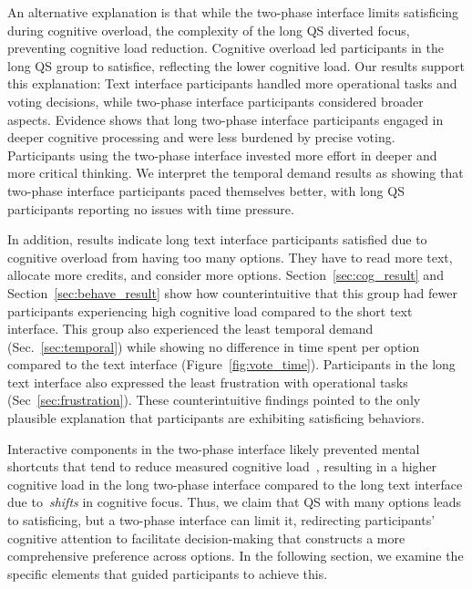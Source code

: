 An alternative explanation is that while the two-phase interface limits satisficing during cognitive overload, the complexity of the long QS diverted focus, preventing cognitive load reduction. Cognitive overload led participants in the long QS group to satisfice, reflecting the lower cognitive load. Our results support this explanation: Text interface participants handled more operational tasks and voting decisions, while two-phase interface participants considered broader aspects. Evidence shows that long two-phase interface participants engaged in deeper cognitive processing and were less burdened by precise voting. Participants using the two-phase interface invested more effort in deeper and more critical thinking. We interpret the temporal demand results as showing that two-phase interface participants paced themselves better, with long QS participants reporting no issues with time pressure.

In addition, results indicate long text interface participants satisfied due to cognitive overload from having too many options. They have to read more text, allocate more credits, and consider more options. Section~\ref{sec:cog_result} and Section~\ref{sec:behave_result} show how counterintuitive that this group had fewer participants experiencing high cognitive load compared to the short text interface. This group also experienced the least temporal demand (Sec.~\ref{sec:temporal}) while showing no difference in time spent per option compared to the text interface (Figure~\ref{fig:vote_time}). Participants in the long text interface also expressed the least frustration with operational tasks (Sec~\ref{sec:frustration}). These counterintuitive findings pointed to the only plausible explanation that participants are exhibiting satisficing behaviors. 

Interactive components in the two-phase interface likely prevented mental shortcuts that tend to reduce measured cognitive load~\cite{daniel2017thinking, simonBehavioralModelRational1955, payneAdaptiveStrategySelection1988, tverskyJudgmentsRepresentativeness}, resulting in a higher cognitive load in the long two-phase interface compared to the long text interface due to~\textit{shifts} in cognitive focus. Thus, we claim that QS with many options leads to satisficing, but a two-phase interface can limit it, redirecting participants' cognitive attention to facilitate decision-making that constructs a more comprehensive preference across options. In the following section, we examine the specific elements that guided participants to achieve this.


